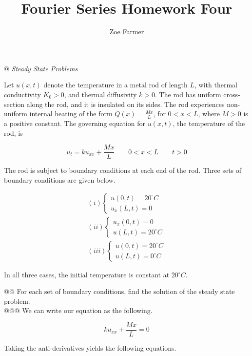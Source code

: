\documentclass[10pt]{article}
\title{Fourier Series Homework Four}
\author{Zoe Farmer}
\begin{document}
\maketitle

\begin{easylist}[enumerate]
    @ \textit{Steady State Problems}

    Let $u(x, t)$ denote the temperature in a metal rod of length $L$, with thermal conductivity $K_0 > 0$, and thermal
    diffusivity $k >0$. The rod has uniform cross-section along the rod, and it is insulated on its sides. The rod
    experiences non-uniform internal heating of the form $Q(x) = \frac{Mx}{L}$, for $0 < x < L$, where $M>0$ is a
    positive constant. The governing equation for $u(x, t)$, the temperature of the rod, is

    \[
        u_t = ku_{xx} + \frac{Mx}{L} \qquad 0 < x < L \qquad t > 0
    \]

    The rod is subject to boundary conditions at each end of the rod. Three sets of boundary conditions are given below.

    \begin{align*}
        (i) \begin{cases}
            u(0, t) = 20^\circ C\\
            u_x(L, t) = 0
        \end{cases}\\
        (ii) \begin{cases}
            u_x(0, t) = 0\\
            u(L, t) = 20^\circ C
        \end{cases}\\
        (iii) \begin{cases}
            u(0, t) = 20^\circ C\\
            u(L, t) = 0^\circ C
        \end{cases}
    \end{align*}

    In all three cases, the initial temperature is constant at $20^\circ C$.

    @@ For each set of boundary conditions, find the solution of the steady state problem.\\

    @@@ We can write our equation as the following.

    \[
        k u_{xx} + \frac{Mx}{L} = 0
    \]

    Taking the anti-derivatives yields the following equations.


\end{easylist}
\end{document}
